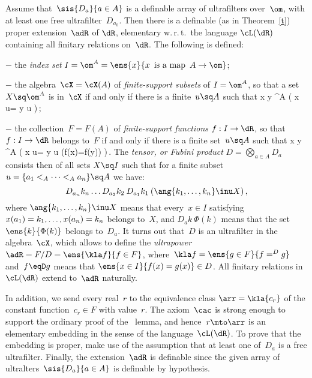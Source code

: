 \documentclass[11pt,
]{article}
\begin{document}
\bpro
[in~$\ZF+\cac$]
\label{kst}
Assume that\/~$\sis{D_a}{a\in A}$ is a 
definable array of ultrafilters over\/~$\om$, 
with at least one free ultrafilter\/~$D_{a_0}$. 
Then there is a definable\/ 
{\rm(as in Theorem~\ref{t})} proper extension\/~$\adR$ of\/ 
$\dR$, elementary w.\,r.\,t.\ the language\/ 
$\cL(\dR)$ containing 
all finitary relations on\/~$\dR$. 
\epro
{}
The following is defined:
\bit
\item[$-$]
the {\it index set\/} 
$I=\om^A=\ens{x}{x\,\text{ is a map }\,A\to\om}$;

\item[$-$] the algebra~$\cX=\cX(A)$ of {\em finite-support subsets} of
$I=\om^A$, so that a set~$X\sq\om^A$ is in~$\cX$ if and only if there
is a finite~$u\sq A$ such that
%
\dm
\kaz x \zi y \in \om^A\; \big( {x \res u= y \res u}
 \big)\,;
\dm

\item[$-$] the collection~$F=F(A)$ of {\em finite-support functions}
$f:I\to\dR$, so that~$f:I\to\dR$ belongs to~$F$ if and only if there
is a finite set~$u\sq A$ such that
%
\dm
\kaz x \zi y \in \om^A\; \big( {x \res u= y \res u}\limp
{(f(x)=f(y))} \big)\,.
\dm
\eit
The {\it tensor, or Fubini product\/}
$D=\bigotimes_{a\in A}D_a$ consists then of all sets 
$X\sq I$ such that for a finite subset 
$u=\{a_1<_A\dots<_A a_n\}\sq A$ we have: 
$$
D_{a_n}k_n\dots D_{a_2}k_2\:D_{a_1}k_1\: 
(\ang{k_1,\dots,k_n}\inu X)\,,
$$
where  
$\ang{k_1,\dots,k_n}\inu X$ 
means that every~$x\in I$ satisfying 
$x(a_1)=k_1,\dots,\linebreak[0]x(a_n)=k_n$ 
belongs to~$X$, and 
$D_a k\,\Phi(k)$ means that the set 
$\ens{k}{\Phi(k)}$ belongs to~$D_a$.
%
It turns out that~$D$ is an ultrafilter in the algebra~$\cX$, which
allows to define the {\it ultrapower\/}~$\adR=F/D=\ens{\kla f}{f\in
F}$, where~$\kla f=\ens{g\in F}{f=^D g}$ and~$f\eqD g$ means that
$\ens{x \in I}{f(x )=g(x )} \in D$.  All finitary relations in
$\cL(\dR)$ extend to~$\adR$ naturally.

In addition, we send every real~$r$ to the equivalence class
$\arr=\kla{c_r}$ of the constant function~$c_r\in F$ with value~$r$.
The axiom~$\cac$ is strong enough to support the ordinary proof of the
\los\ lemma, and hence~$r\mto\arr$ is an elementary embedding in the
sense of the language~$\cL(\dR)$.
%
To prove that the embedding is proper, make use of 
the assumption that at least one of~$D_a$ is a free 
ultrafilter.
%
Finally, the extension~$\adR$ is definable since the given array of
ultralters~$\sis{D_a}{a\in A}$ is definable by hypothesis.  \epf
\end{document}
